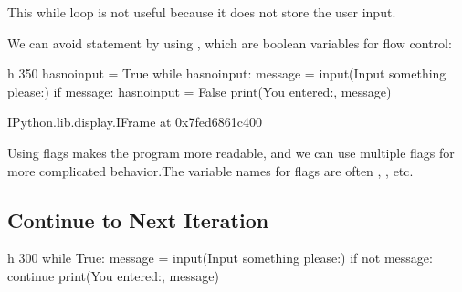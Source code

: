\documentclass[letterpaper,10pt,english]{sphinxmanual}
\begin{document}
This while loop is not useful because it does not store the user input.


We can avoid  statement by using , which are boolean variables for flow control:

\begin{sphinxVerbatim}[commandchars=\\\{\}]
 \PYGZhy{}h 350
has\PYGZus{}no\PYGZus{}input = True
while has\PYGZus{}no\PYGZus{}input:
    message = input(\PYGZsq{}Input something please:\PYGZsq{})
    if message: has\PYGZus{}no\PYGZus{}input = False
print(\PYGZsq{}You entered:\PYGZsq{}, message)
\end{sphinxVerbatim}

\begin{sphinxVerbatim}[commandchars=\\\{\}]
\PYGZlt{}IPython.lib.display.IFrame at 0x7fed6861c400\PYGZgt{}
\end{sphinxVerbatim}

Using flags makes the program more readable, and we can use multiple flags for more complicated behavior.The variable names for flags are often , , etc.


\subsection{Continue to Next Iteration}
\label{\detokenize{Lecture3/Iteration:continue-to-next-iteration}}

\begin{sphinxVerbatim}[commandchars=\\\{\}]
 \PYGZhy{}h 300
while True:
    message = input(\PYGZsq{}Input something please:\PYGZsq{})
    if not message: continue
    print(\PYGZsq{}You entered:\PYGZsq{}, message)
\end{sphinxVerbatim}
\end{document}
